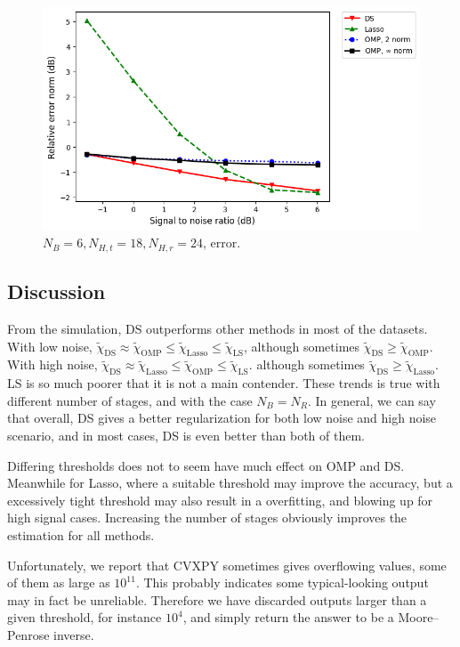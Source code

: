 \documentclass[journal]{IEEEtran}
\newcommand {\m} [1] {\( #1 \)}
\begin{document}
\begin {figure} [H]
\includegraphics [width = 0.45 \textwidth]
{error-big-more-wide-six-usual.png}
\caption {\m {N_B = 6, N_{H,t} = 18, N_{H,r} = 24}, error.}
\end {figure}

\subsection {Discussion}

From the simulation, DS outperforms other methods in most of the datasets.
With low noise, \m {\tilde {\chi} _{\mathrm {DS}} \approx \tilde {\chi} _{\mathrm {OMP}} \leq \tilde {\chi} _{\mathrm {Lasso}} \leq \tilde {\chi} _{\mathrm {LS}}},
although sometimes \m {\tilde {\chi} _{\mathrm {DS}} \geq \tilde {\chi} _{\mathrm {OMP}}}.
With high noise, \m {\tilde {\chi} _{\mathrm {DS}} \approx \tilde {\chi} _{\mathrm {Lasso}} \leq \tilde {\chi} _{\mathrm {OMP}} \leq \tilde {\chi} _{\mathrm {LS}}}.
although sometimes \m {\tilde {\chi} _{\mathrm {DS}} \geq \tilde {\chi} _{\mathrm {Lasso}}}.
LS is so much poorer that it is not a main contender.
These trends is true with different number of stages, and with the case \m {N_B = N_R}.
In general, we can say that overall, DS gives a better regularization for both low noise and high noise scenario, and in most cases, DS is even better than both of them.

Differing thresholds does not to seem have much effect on OMP and DS.
Meanwhile for Lasso, where a suitable threshold may improve the accuracy, but a excessively tight threshold may also result in a overfitting, and blowing up for high signal cases.
Increasing the number of stages obviously improves the estimation for all methods.

Unfortunately, we report that CVXPY sometimes gives overflowing values, some of them as large as \m {10^{11}}.
This probably indicates some typical-looking output may in fact be unreliable.
Therefore we have discarded outputs larger than a given threshold, for instance \m {10^4}, and simply return the answer to be a Moore–Penrose inverse.
\end{document}

